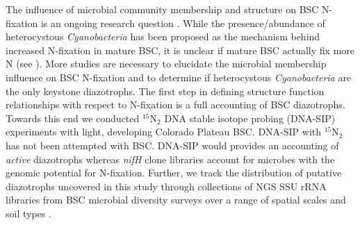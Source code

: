 The influence of microbial community membership and structure on BSC N-fixation
is an ongoing research question \citep{Belnap28062013}. While the
presence/abundance of heterocystous \textit{Cyanobacteria} has been proposed as
the mechanism behind increased N-fixation in mature BSC, it is unclear if
mature BSC actually fix more N (see \citet{15643930}). More studies are
necessary to elucidate the microbial membership influence on BSC N-fixation and
to determine if heterocystous \textit{Cyanobacteria} are the only keystone
diazotrophs. The first step in defining structure function relationships with
respect to N-fixation is a full accounting of BSC diazotrophs. Towards this end
we conducted $^{15}$N$_{2}$ DNA stable isotope probing (DNA-SIP) experiments
with light, developing Colorado Plateau BSC. DNA-SIP with $^{15}$N$_{2}$ has not
been attempted with BSC. DNA-SIP would provides an accounting of 
\textit{active} diazotrophs whereas \textit{nifH} clone libraries account for 
microbes with the genomic potential for N-fixation. Further, we track the
distribution of putative diazotrophs uncovered in this study through
collections of NGS SSU rRNA libraries from BSC microbial diversity surveys over
a range of spatial scales and soil types \citep{Garcia_Pichel_2013,
Steven_2013}. 
